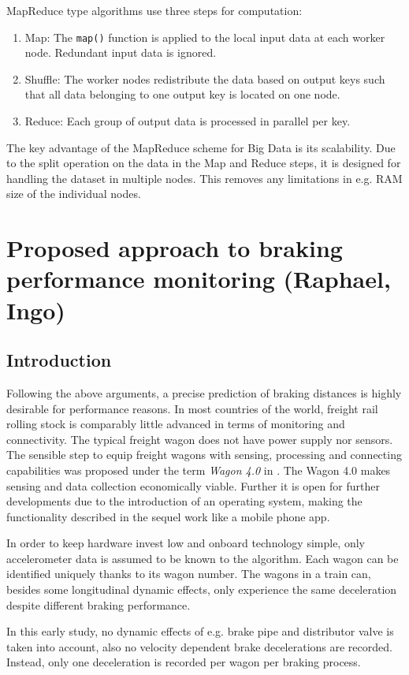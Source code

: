 \documentclass[a4paper, 12pt]{scrartcl}
\begin{document}
MapReduce type algorithms use three steps for computation:
\begin{enumerate}
	\item Map: The \texttt{map()} function is applied to the local input data at each worker node. Redundant input data is ignored.
	\item Shuffle: The worker nodes redistribute the data based on output keys such that all data belonging to one output key is located on one node.
	\item Reduce: Each group of output data is processed in parallel per key. 
\end{enumerate}

The key advantage of the MapReduce scheme for Big Data is its scalability. Due to the split operation on the data in the Map and Reduce steps, it is designed for handling the dataset in multiple nodes. This removes any limitations in e.g. RAM size of the individual nodes.

\section{Proposed approach to braking performance monitoring (Raphael, Ingo)}
\subsection{Introduction}
Following the above arguments, a precise prediction of braking distances is highly desirable for performance reasons. In most countries of the world, freight rail rolling stock is comparably little advanced in terms of monitoring and connectivity. The typical freight wagon does not have power supply nor sensors. The sensible step to equip freight wagons with sensing, processing and connecting capabilities was proposed under the term \textit{Wagon 4.0} in \cite{pfaff2017stephenson}. The Wagon 4.0 makes sensing and data collection economically viable. Further it is open for further developments due to the introduction of an operating system, making the functionality described in the sequel work like a mobile phone app.

In order to keep hardware invest low and onboard technology simple, only accelerometer data is assumed to be known to the algorithm. Each wagon can be identified uniquely thanks to its wagon number. The wagons in a train can, besides some longitudinal dynamic effects, only experience the same deceleration despite different braking performance.

In this early study, no dynamic effects of e.g. brake pipe and distributor valve is taken into account, also no velocity dependent brake decelerations are recorded. Instead, only one deceleration is recorded per wagon per braking process.
\end{document}
